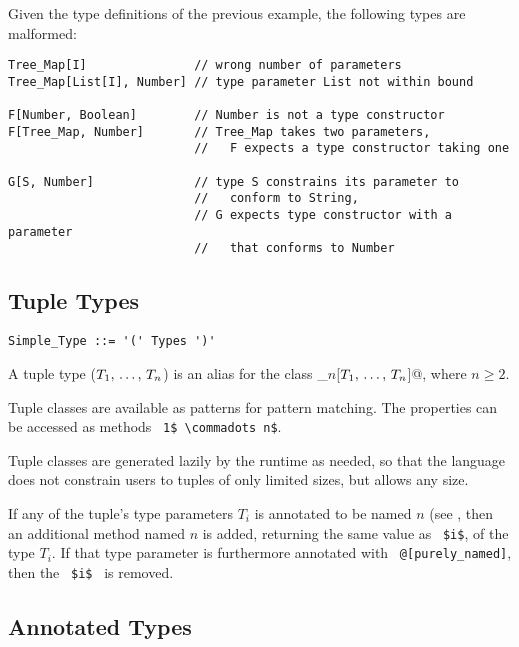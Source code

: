 \example
\label{example:parameterized-types-mal}

Given the type definitions of the previous example, the following types are malformed: 

\begin{lstlisting}
Tree_Map[I]               // wrong number of parameters
Tree_Map[List[I], Number] // type parameter List not within bound

F[Number, Boolean]        // Number is not a type constructor
F[Tree_Map, Number]       // Tree_Map takes two parameters, 
                          //   F expects a type constructor taking one

G[S, Number]              // type S constrains its parameter to
                          //   conform to String, 
                          // G expects type constructor with a parameter
                          //   that conforms to Number
\end{lstlisting}





\subsection{Tuple Types}
\label{sec:tuple-types}

\syntax\begin{lstlisting}
Simple_Type ::= '(' Types ')'
\end{lstlisting}

A tuple type ($T_1 ,\, \ldots ,\, T_n$) is an alias for the class \lstinline@Tuple_$n$[$T_1 ,\, \ldots ,\, T_n$]@, where $n \geq 2$. 

Tuple classes are available as patterns for pattern matching. The properties can be accessed as methods ~\lstinline!1$ \commadots n$!. 

Tuple classes are generated lazily by the runtime as needed, so that the language does not constrain users to tuples of only limited sizes, but allows any size. 

If any of the tuple's type parameters $T_i$ is annotated to be named $n$ (see , then an additional method named $n$ is added, returning the same value as ~\lstinline!$i$!, of the type $T_i$. If that type parameter is furthermore annotated with ~\lstinline!@[purely_named]!, then the ~\lstinline!$i$!~ is removed. 






\subsection{Annotated Types}

